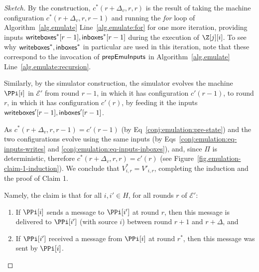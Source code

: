 \begin{proof}[Sketch]
  By the \rollerblade construction,
  $c^*(r + \Delta_v, r, r)$ is the result of
  taking the machine configuration
  $c^*(r + \Delta_v, r, r - 1)$
  and running the \emph{for} loop of Algorithm~\ref{alg.emulate} Line~\ref{alg.emulate:for}
  for one more iteration, providing inputs $\textsf{writeboxes}^*[r - 1], \textsf{inboxes}^*[r - 1]$
  during the execution of $\Z[j][i]$.
  To see why $\textsf{writeboxes}^*, \textsf{inboxes}^*$ in particular are used in this iteration,
  note that these correspond to the invocation of $\textsf{prepEmuInputs}$ in
  Algorithm~\ref{alg.emulate} Line~\ref{alg.emulate:recursion}.

  Similarly, by the simulator construction, %
  the simulator evolves the machine $\PPi[i]$ in $\mathcal{E}'$ from round $r - 1$,
  in which it has configuration $c'(r - 1)$,
  to round $r$,
  in which it has configuration $c'(r)$,
  by feeding it the inputs $\textsf{writeboxes}'[r - 1], \textsf{inboxes}'[r - 1]$.

  As $c^*(r + \Delta_v, r, r - 1) = c'(r - 1)$ (by Eq~\ref{conj:emulation:pre-state})
  and the two configurations evolve using the same inputs (by
  Eqs~\ref{conj:emulation:eq-inputs-writes} and \ref{conj:emulation:eq-inputs-inboxes}),
  and, since $\Pi$ is deterministic,
  therefore $c^*(r + \Delta_v, r, r) = c'(r)$ (see Figure~\ref{fig.emulation-claim-1-induction}).
  We conclude that $V^*_{i,r} = V'_{i,r}$, completing the induction
  and the proof of Claim 1.

  Namely, the claim is that for all $i, i' \in H$, for all rounds $r$ of $\mathcal{E}'$:

  \begin{enumerate}[label=(\alph*)]
    \item
    \label{conj:emulation:claim-delta-a}
    If $\PPi[i]$ sends a message to $\PPi[i']$ at round $r$, then this message is delivered to $\PPi[i']$
    (with source $i$) between round $r + 1$ and $r + \Delta$, and

    \item
    \label{conj:emulation:claim-delta-b}
    If $\PPi[i']$ received a message from $\PPi[i]$ at round $r^*$, then this message was sent by $\PPi[i]$.
  \end{enumerate}



\end{proof}

